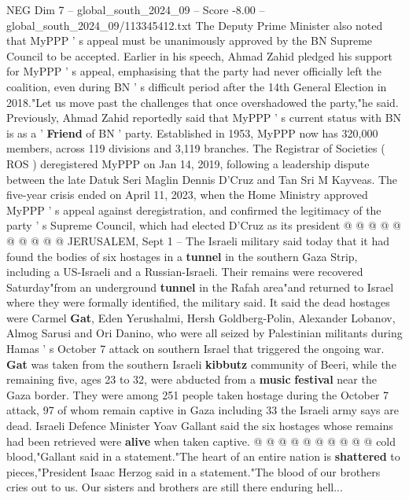 \begin{textsample}{NEG Dim 7 – global\_south\_2024\_09 – Score -8.00 – global\_south\_2024\_09/113345412.txt}  \label{ex:f7_neg_174}
The Deputy Prime Minister also noted that MyPPP ' s appeal must be unanimously approved by the BN Supreme Council to be accepted.
Earlier in his speech, Ahmad Zahid pledged his support for MyPPP ' s appeal, emphasising that the party had never officially left the coalition, even during BN ' s difficult period after the 14th General Election in 2018."Let us move past the challenges that once overshadowed the party,"he said.
Previously, Ahmad Zahid reportedly said that MyPPP ' s current status with BN is as a ' \textbf{Friend} of BN ' party.
Established in 1953, MyPPP now has 320,000 members, across 119 divisions and 3,119 branches.
The Registrar of Societies ( ROS ) deregistered MyPPP on Jan 14, 2019, following a leadership dispute between the late Datuk Seri Maglin Dennis D'Cruz and Tan Sri M Kayveas.
The five-year crisis ended on April 11, 2023, when the Home Ministry approved MyPPP ' s appeal against deregistration, and confirmed the legitimacy of the party ' s Supreme Council, which had elected D'Cruz as its president @ @ @ @ @ @ @ @ @ @ JERUSALEM, Sept 1 -- The Israeli military said today that it had found the bodies of six hostages in a \textbf{tunnel} in the southern Gaza Strip, including a US-Israeli and a Russian-Israeli.
Their remains were recovered Saturday"from an underground \textbf{tunnel} in the Rafah area"and returned to Israel where they were formally identified, the military said.
It said the dead hostages were Carmel \textbf{Gat}, Eden Yerushalmi, Hersh Goldberg-Polin, Alexander Lobanov, Almog Sarusi and Ori Danino, who were all seized by Palestinian militants during Hamas ' s October 7 attack on southern Israel that triggered the ongoing war. \textbf{Gat} was taken from the southern Israeli \textbf{kibbutz} community of Beeri, while the remaining five, ages 23 to 32, were abducted from a \textbf{music} \textbf{festival} near the Gaza border.
They were among 251 people taken hostage during the October 7 attack, 97 of whom remain captive in Gaza including 33 the Israeli army says are dead.
Israeli Defence Minister Yoav Gallant said the six hostages whose remains had been retrieved were \textbf{alive} when taken captive. @ @ @ @ @ @ @ @ @ @ cold blood,"Gallant said in a statement."The heart of an entire nation is \textbf{shattered} to pieces,"President Isaac Herzog said in a statement."The blood of our brothers cries out to us.
Our sisters and brothers are still there enduring hell...

\end{textsample}
